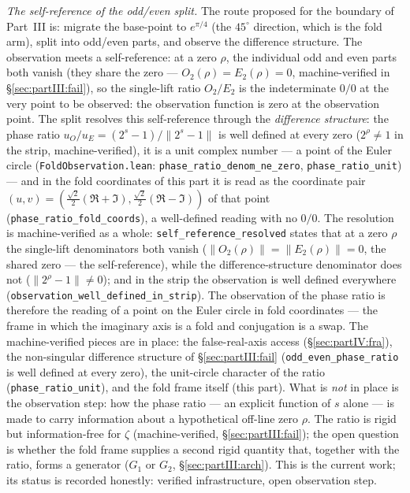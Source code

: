 \documentclass{article}
\newcommand{\zt}{\zeta}
\begin{document}
\emph{The self-reference of the odd/even split.} The route proposed for
the boundary of Part~III is: migrate the base-point to $e^{\pi/4}$ (the
$45^\circ$ direction, which is the fold arm), split into odd/even parts,
and observe the difference structure. The observation meets a
self-reference: at a zero $\rho$, the individual odd and even parts both
vanish (they share the zero --- $O_2(\rho)=E_2(\rho)=0$, machine-verified
in \S\ref{sec:partIII:fail}), so the single-lift ratio $O_2/E_2$ is the
indeterminate $0/0$ at the very point to be observed: the observation
function is zero at the observation point. The split resolves this
self-reference through the \emph{difference structure}: the phase ratio
$u_O/u_E=(2^s-1)/\|2^s-1\|$ is well defined at every zero
($2^\rho\ne 1$ in the strip, machine-verified), it is a unit complex
number --- a point of the Euler circle
(\texttt{FoldObservation.lean}: \texttt{phase\_ratio\_denom\_ne\_zero},
\texttt{phase\_ratio\_unit}) --- and in the fold coordinates of this
part it is read as the coordinate pair
$(u,v)=(\frac{\sqrt2}{2}(\Re+\Im),\frac{\sqrt2}{2}(\Re-\Im))$ of that
point (\texttt{phase\_ratio\_fold\_coords}), a well-defined reading with
no $0/0$. The resolution is machine-verified as a whole:
\texttt{self\_reference\_resolved} states that at a zero $\rho$ the
single-lift denominators both vanish ($\|O_2(\rho)\|=\|E_2(\rho)\|=0$,
the shared zero --- the self-reference), while the difference-structure
denominator does not ($\|2^\rho-1\|\ne 0$); and in the strip the
observation is well defined everywhere
(\texttt{observation\_well\_defined\_in\_strip}). The observation of
the phase ratio is therefore the reading of a point on the Euler circle
in fold coordinates --- the frame in which the imaginary axis is a fold
and conjugation is a swap. The machine-verified pieces are in place:
the false-real-axis access (\S\ref{sec:partIV:fra}), the non-singular
difference structure of \S\ref{sec:partIII:fail}
(\texttt{odd\_even\_phase\_ratio} is well defined at every zero), the
unit-circle character of the ratio (\texttt{phase\_ratio\_unit}), and
the fold frame itself (this part). What is \emph{not} in place is the
observation step: how the phase ratio --- an explicit function of $s$
alone --- is made to carry information about a hypothetical off-line
zero $\rho$. The ratio is
rigid but information-free for $\zt$ (machine-verified,
\S\ref{sec:partIII:fail}); the open question is whether the fold frame
supplies a second rigid quantity that, together with the ratio, forms a
generator ($G_1$ or $G_2$, \S\ref{sec:partIII:arch}). This is the
current work; its status is recorded honestly: verified infrastructure,
open observation step.
\end{document}
